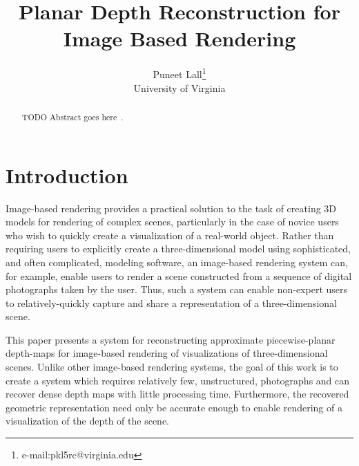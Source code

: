 \documentclass[conference]{acmsiggraph}
\title{Planar Depth Reconstruction for Image Based Rendering}
\author{Puneet Lall\thanks{e-mail:pkl5rc@virginia.edu}\\University of Virginia}
\begin{document}

\maketitle

\begin{abstract}


    TODO Abstract goes here~\cite{furukawa2010accurate}.

\end{abstract}






\copyrightspace

\section{Introduction}

Image-based rendering provides a practical solution to the task of creating
3D models for rendering of complex scenes, particularly in the case of
novice users who wish to quickly create a visualization of a real-world object.
Rather than requiring users to explicitly create a three-dimensional model using
sophisticated, and often complicated, modeling software, an image-based rendering
system can, for example, 
enable users to render a scene constructed from a sequence of
digital photographs taken by the user.  Thus, such a system can enable
non-expert users to relatively-quickly capture and share a representation of
a three-dimensional scene.

This paper presents a system for reconstructing approximate
piecewise-planar depth-maps for image-based rendering of visualizations
of three-dimensional scenes.  Unlike other image-based rendering systems,
the goal of this work is to create a system which requires relatively few,
unstructured, photographs and can recover dense depth maps with little
processing time.  Furthermore, the recovered geometric representation need
only be accurate enough to enable rendering of a visualization of the depth
of the scene.
 
\end{document}
